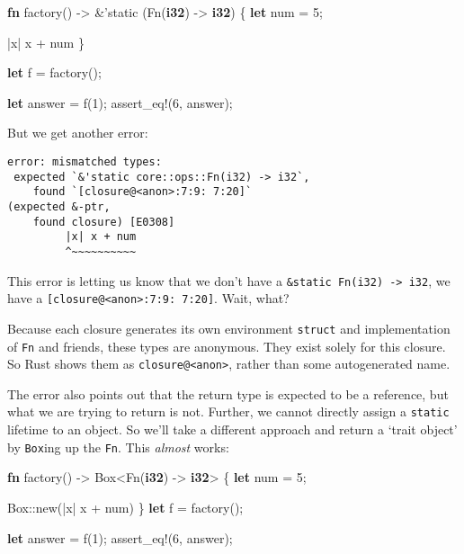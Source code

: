 \documentclass[a4paper,]{book}
\newenvironment{Shaded}{\begin{snugshade}}{\end{snugshade}}
\newcommand{\KeywordTok}[1]{\textcolor[rgb]{0.13,0.29,0.53}{\textbf{{#1}}}}
\newcommand{\DecValTok}[1]{\textcolor[rgb]{0.00,0.00,0.81}{{#1}}}
\newcommand{\OtherTok}[1]{\textcolor[rgb]{0.56,0.35,0.01}{{#1}}}
\newcommand{\NormalTok}[1]{{#1}}
\begin{document}
\begin{Shaded}
\begin{Highlighting}[]
\KeywordTok{fn} \NormalTok{factory() -> &}\OtherTok{'static} \NormalTok{(Fn(}\KeywordTok{i32}\NormalTok{) -> }\KeywordTok{i32}\NormalTok{) \{}
    \KeywordTok{let} \NormalTok{num = }\DecValTok{5}\NormalTok{;}

    \NormalTok{|x| x + num}
\NormalTok{\}}

\KeywordTok{let} \NormalTok{f = factory();}

\KeywordTok{let} \NormalTok{answer = f(}\DecValTok{1}\NormalTok{);}
\OtherTok{assert_eq!}\NormalTok{(}\DecValTok{6}\NormalTok{, answer);}
\end{Highlighting}
\end{Shaded}

But we get another error:

\begin{verbatim}
error: mismatched types:
 expected `&'static core::ops::Fn(i32) -> i32`,
    found `[closure@<anon>:7:9: 7:20]`
(expected &-ptr,
    found closure) [E0308]
         |x| x + num
         ^~~~~~~~~~~
\end{verbatim}

This error is letting us know that we don't have a
\texttt{\&\textquotesingle{}static\ Fn(i32)\ -\textgreater{}\ i32}, we
have a \texttt{{[}closure@\textless{}anon\textgreater{}:7:9:\ 7:20{]}}.
Wait, what?

Because each closure generates its own environment \texttt{struct} and
implementation of \texttt{Fn} and friends, these types are anonymous.
They exist solely for this closure. So Rust shows them as
\texttt{closure@\textless{}anon\textgreater{}}, rather than some
autogenerated name.

The error also points out that the return type is expected to be a
reference, but what we are trying to return is not. Further, we cannot
directly assign a \texttt{\textquotesingle{}static} lifetime to an
object. So we'll take a different approach and return a `trait object'
by \texttt{Box}ing up the \texttt{Fn}. This \emph{almost} works:

\begin{Shaded}
\begin{Highlighting}[]
\KeywordTok{fn} \NormalTok{factory() -> Box<Fn(}\KeywordTok{i32}\NormalTok{) -> }\KeywordTok{i32}\NormalTok{> \{}
    \KeywordTok{let} \NormalTok{num = }\DecValTok{5}\NormalTok{;}

    \NormalTok{Box::new(|x| x + num)}
\NormalTok{\}}
\KeywordTok{let} \NormalTok{f = factory();}

\KeywordTok{let} \NormalTok{answer = f(}\DecValTok{1}\NormalTok{);}
\OtherTok{assert_eq!}\NormalTok{(}\DecValTok{6}\NormalTok{, answer);}
\end{Highlighting}
\end{Shaded}
\end{document}
